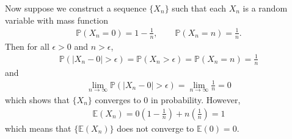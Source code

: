 \documentclass[a4paper,12pt]{article}
\begin{document}
\begin{enumerate}
        \bigskip

        Now suppose we construct a sequence $\{ X_n \}$ such that each $X_n$ is a random variable with mass function
        \begin{align*}
            \mathbb{P}(X_n = 0) = 1 - \frac{1}{n}, \qquad \mathbb{P}(X_n = n) = \frac{1}{n}.
        \end{align*}
        Then for all $\epsilon > 0$ and $n > \epsilon$,
        \begin{align*}
            \mathbb{P}(|X_n - 0| > \epsilon) = \mathbb{P}(X_n > \epsilon) = \mathbb{P}(X_n = n) = \frac{1}{n}
        \end{align*}
        and
        \begin{align*}
            \lim_{n \to \infty} \mathbb{P}(|X_n - 0| > \epsilon) = \lim_{n \to \infty} \frac{1}{n} = 0
        \end{align*}
        which shows that $\{ X_n \}$ converges to $0$ in probability. However,
        \begin{align*}
            \mathbb{E}(X_n) = 0 \left(1 - \frac{1}{n} \right) + n \left( \frac{1}{n} \right) = 1
        \end{align*}
        which means that $\{ \mathbb{E}(X_n) \}$ does not converge to $\mathbb{E}(0) = 0$.

\end{enumerate}
\end{document}
